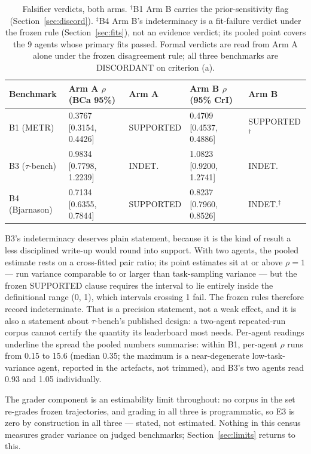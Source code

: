\documentclass[11pt]{article}
\begin{document}
\begin{table}[t]
\centering\small
\begin{tabular}{@{}lllll@{}}
\toprule
Benchmark & Arm A $\rho$ (BCa 95\%) & Arm A & Arm B $\rho$ (95\% CrI) & Arm B \\
\midrule
B1 (METR) & 0.3767 [0.3154, 0.4426] & SUPPORTED & 0.4709 [0.4537, 0.4886] & SUPPORTED$^\dagger$ \\
B3 ($\tau$-bench) & 0.9834 [0.7798, 1.2239] & INDET. & 1.0823 [0.9200, 1.2741] & INDET. \\
B4 (Bjarnason) & 0.7134 [0.6355, 0.7844] & SUPPORTED & 0.8237 [0.7960, 0.8526] & INDET.$^\ddagger$ \\
\bottomrule
\end{tabular}
\caption{Falsifier verdicts, both arms. $^\dagger$B1 Arm B carries the
prior-sensitivity flag (Section~\ref{sec:discord}). $^\ddagger$B4 Arm
B's indeterminacy is a fit-failure verdict under the frozen rule
(Section~\ref{sec:fits}), not an evidence verdict; its pooled point
covers the 9 agents whose primary fits passed. Formal verdicts are
read from Arm A alone under the frozen disagreement rule; all three
benchmarks are DISCORDANT on criterion (a).}
\label{tab:verdicts}
\end{table}

B3's indeterminacy deserves plain statement, because it is the kind of
result a less disciplined write-up would round into support. With two
agents, the pooled estimate rests on a cross-fitted pair ratio; its
point estimates sit at or above $\rho = 1$ --- run variance comparable
to or larger than task-sampling variance --- but the frozen SUPPORTED
clause requires the interval to lie entirely inside the definitional
range (0, 1), which intervals crossing 1 fail. The frozen rules
therefore record indeterminate. That is a precision statement, not a
weak effect, and it is also a statement about $\tau$-bench's published
design: a two-agent repeated-run corpus cannot certify the quantity
its leaderboard most needs. Per-agent readings underline the spread
the pooled numbers summarise: within B1, per-agent $\rho$ runs from
0.15 to 15.6 (median 0.35; the maximum is a near-degenerate
low-task-variance agent, reported in the artefacts, not trimmed), and
B3's two agents read 0.93 and 1.05 individually.

The grader component is an estimability limit throughout: no corpus
in the set re-grades frozen trajectories, and grading in all three is
programmatic, so E3 is zero by construction in all three --- stated,
not estimated. Nothing in this census measures grader variance on
judged benchmarks; Section~\ref{sec:limits} returns to this.
\end{document}
